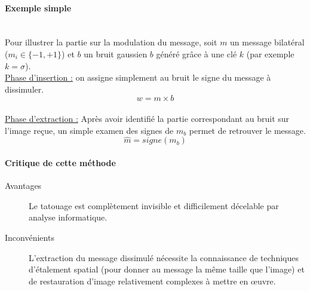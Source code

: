 \paragraph{Exemple simple}~\\\indent
Pour illustrer la partie sur la modulation du message, soit $m$ un message bilatéral ($m_{i} \in \{-1,+1\}$) et $b$ un bruit gaussien $b$ généré grâce à une clé $k$ (par exemple $k = \sigma$).
~\\
\underline{Phase d'insertion :} on assigne simplement au bruit le signe du message à dissimuler.$$ w = m \times b $$
~\\
\underline{Phase d'extraction :} Après avoir identifié la partie correspondant au bruit sur l'image reçue, un simple examen des signes de $m_{b}$ permet de retrouver le message.$$ \hat{m} = signe(m_{b}) $$



\paragraph{Critique de cette méthode}
\begin{description}
\item[Avantages] Le tatouage est complètement invisible et difficilement décelable par analyse informatique.
\item[Inconvénients] L'extraction du message dissimulé nécessite la connaissance de techniques d'étalement spatial (pour donner au message la même taille que l'image) et de restauration d'image relativement complexes à mettre en \oe{}uvre.
\end{description}




